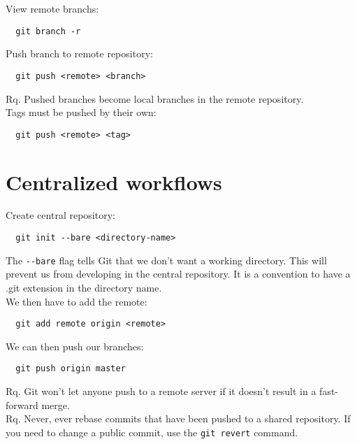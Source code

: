\documentclass[french]{article}
\begin{document}
View remote branchs:
\begin{verbatim}
  git branch -r
\end{verbatim}

Push branch to remote repository:
\begin{verbatim}
  git push <remote> <branch>
\end{verbatim}
Rq. \danger Pushed branches become local branches in the remote repository.\\

Tags must be pushed by their own:
\begin{verbatim}
  git push <remote> <tag>
\end{verbatim}

\section{Centralized workflows}

Create central repository:
\begin{verbatim}
  git init --bare <directory-name>
\end{verbatim}
The \verb|--bare| flag tells Git that we don't want a working directory. This will prevent us from developing in the central repository. It is a convention to have a .git extension in the directory name. \\

We then have to add the remote:
\begin{verbatim}
  git add remote origin <remote>
\end{verbatim}


We can then push our branches:
\begin{verbatim}
  git push origin master
\end{verbatim}

Rq. Git won't let anyone push to a remote server if it doesn't result in a fast-forward merge.\\

Rq. Never, ever rebase commits that have been pushed to a shared repository. If you need to change a public commit, use the \verb|git revert| command.
\end{document}
